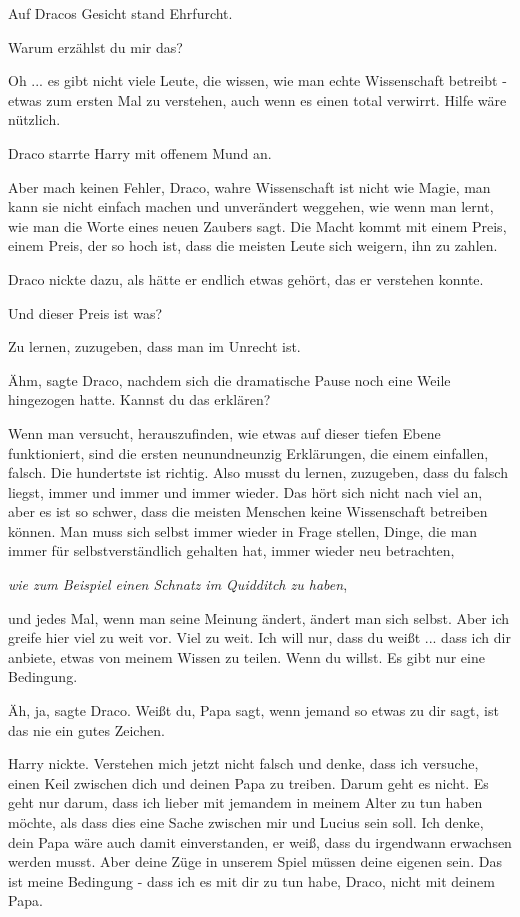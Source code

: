 Auf Dracos Gesicht stand Ehrfurcht.

\glqq{}Warum erzählst du mir das?\grqq{}

\glqq{}Oh ... es gibt nicht viele Leute, die wissen, wie man echte Wissenschaft
betreibt - etwas zum ersten Mal zu verstehen, auch wenn es einen total verwirrt.
Hilfe wäre nützlich.\grqq{}

Draco starrte Harry mit offenem Mund an.

\glqq{}Aber mach keinen Fehler, Draco, wahre Wissenschaft ist nicht wie Magie,
man kann sie nicht einfach machen und unverändert weggehen, wie wenn man lernt,
wie man die Worte eines neuen Zaubers sagt. Die Macht kommt mit einem Preis,
einem Preis, der so hoch ist, dass die meisten Leute sich weigern, ihn zu
zahlen.\grqq{}

Draco nickte dazu, als hätte er endlich etwas gehört, das er verstehen konnte.

\glqq{}Und dieser Preis ist was?\grqq{}

\glqq{}Zu lernen, zuzugeben, dass man im Unrecht ist.\grqq{}

\glqq{}Ähm\grqq{}, sagte Draco, nachdem sich die dramatische Pause noch eine
Weile hingezogen hatte. \glqq{}Kannst du das erklären?\grqq{}

\glqq{}Wenn man versucht, herauszufinden, wie etwas auf dieser tiefen Ebene
funktioniert, sind die ersten neunundneunzig Erklärungen, die einem einfallen,
falsch. Die hundertste ist richtig. Also musst du lernen, zuzugeben, dass du
falsch liegst, immer und immer und immer wieder. Das hört sich nicht nach viel
an, aber es ist so schwer, dass die meisten Menschen keine Wissenschaft
betreiben können. Man muss sich selbst immer wieder in Frage stellen, Dinge, die
man immer für selbstverständlich gehalten hat, immer wieder neu
betrachten\grqq{},

\emph{wie zum Beispiel einen Schnatz im Quidditch zu haben},

\glqq{}und jedes Mal, wenn man seine Meinung ändert, ändert man sich selbst.
Aber ich greife hier viel zu weit vor. Viel zu weit. Ich will nur, dass du
weißt ... dass ich dir anbiete, etwas von meinem Wissen zu teilen. Wenn du
willst. Es gibt nur eine Bedingung.\grqq{}

\glqq{}Äh, ja\grqq{}, sagte Draco. \glqq{}Weißt du, Papa sagt, wenn jemand so
etwas zu dir sagt, ist das nie ein gutes Zeichen.\grqq{}

Harry nickte. \glqq{}Verstehen mich jetzt nicht falsch und denke, dass ich
versuche, einen Keil zwischen dich und deinen Papa zu treiben. Darum geht es
nicht. Es geht nur darum, dass ich lieber mit jemandem in meinem Alter zu tun
haben möchte, als dass dies eine Sache zwischen mir und Lucius sein soll. Ich
denke, dein Papa wäre auch damit einverstanden, er weiß, dass du irgendwann
erwachsen werden musst. Aber deine Züge in unserem Spiel müssen deine eigenen
sein. Das ist meine Bedingung - dass ich es mit dir zu tun habe, Draco, nicht
mit deinem Papa.\grqq{}

